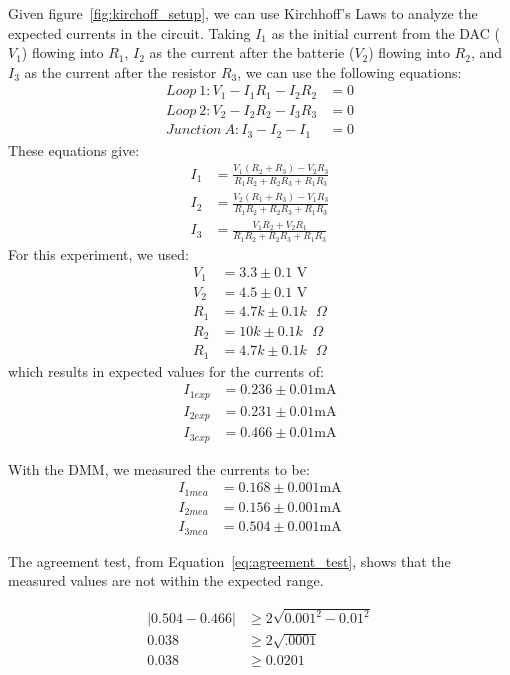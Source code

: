 \documentclass[11pt]{article}
\begin{document}
    Given figure~\ref{fig:kirchoff_setup}, we can use Kirchhoff's Laws to analyze the expected currents in the circuit.
    Taking $I_1$ as the initial current from the DAC ($V_1$) flowing into $R_1$, $I_2$ as the current after the batterie ($V_2$) flowing into $R_2$, and $I_3$ as the current after the resistor $R_3$, we can use the following equations:
    \begin{align*}
        Loop~1: V_1 - I_1 R_1 - I_2 R_2 &= 0 \\
        Loop~2: V_2 - I_2 R_2 - I_3 R_3 &= 0 \\
        Junction~A: I_3 - I_2 - I_1 &= 0
    \end{align*}
    These equations give:
    \begin{align*}
        I_1 &= \frac{V_1(R_2 + R_3) - V_2 R_3}{R_1 R_2 + R_2 R_3 + R_1 R_3} \\
        I_2 &= \frac{V_2(R_1 + R_3) - V_1 R_3}{R_1 R_2 + R_2 R_3 + R_1 R_3} \\
        I_3 &= \frac{V_1 R_2 + V_2 R_1}{R_1 R_2 + R_2 R_3 + R_1 R_3}
    \end{align*}
    For this experiment, we used:
    \begin{align*}
        V_1 &= 3.3 \pm 0.1 \text{ V} \\
        V_2 &= 4.5 \pm 0.1 \text{ V} \\
        R_1 &= 4.7k \pm 0.1k \text{ $\Omega$} \\
        R_2 &= 10k \pm 0.1k \text{ $\Omega$} \\
        R_1 &= 4.7k \pm 0.1k \text{ $\Omega$}
    \end{align*}
    which results in expected values for the currents of:
    \begin{align*}
        I_{1exp} &= 0.236 \pm 0.01 \text{mA} \\
        I_{2exp} &= 0.231 \pm 0.01 \text{mA} \\
        I_{3exp} &= 0.466 \pm 0.01 \text{mA}
    \end{align*}

    With the DMM, we measured the currents to be:
    \begin{align*}
        I_{1mea} &= 0.168 \pm 0.001 \text{mA} \\
        I_{2mea} &= 0.156 \pm 0.001 \text{mA} \\
        I_{3mea} &= 0.504 \pm 0.001 \text{mA}
    \end{align*}

    The agreement test, from Equation~\ref{eq:agreement_test}, shows that the measured values are not within the expected range.
    \begin{e}
        \begin{align*}
            |0.504 - 0.466| &\ge 2 \sqrt{0.001^2 - 0.01^2} \\
            0.038 &\ge 2 \sqrt{.0001} \\
            0.038 &\ge 0.0201
        \end{align*}
    \end{e}
\end{document}
